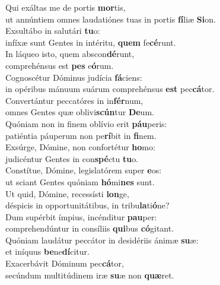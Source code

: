 \evenverse Qui exáltas me de portis \textbf{mor}tis,~\*\\
\evenverse ut annúntiem omnes laudatiónes tuas in portis \textbf{fí}liæ \textbf{Si}on.\\
\oddverse Exsultábo in salutári \textbf{tu}o:~\*\\
\oddverse infíxæ sunt Gentes in intéritu, \textbf{quem} fe\textbf{cé}runt.\\
\evenverse In láqueo isto, quem abscon\textbf{dé}runt,~\*\\
\evenverse comprehénsus est \textbf{pes} e\textbf{ó}rum.\\
\oddverse Cognoscétur Dóminus judícia \textbf{fá}ciens:~\*\\
\oddverse in opéribus mánuum suárum comprehénsus \textbf{est} pec\textbf{cá}tor.\\
\evenverse Convertántur peccatóres in in\textbf{fér}num,~\*\\
\evenverse omnes Gentes quæ oblivi\textbf{scún}tur \textbf{De}um.\\
\oddverse Quóniam non in finem oblívio erit \textbf{páu}peris:~\*\\
\oddverse patiéntia páuperum non pe\textbf{rí}bit in \textbf{fi}nem.\\
\evenverse Exsúrge, Dómine, non confortétur \textbf{ho}mo:~\*\\
\evenverse judicéntur Gentes in con\textbf{spé}ctu \textbf{tu}o.\\
\oddverse Constítue, Dómine, legislatórem super \textbf{e}os:~\*\\
\oddverse ut sciant Gentes quóniam \textbf{hó}mi\textbf{nes} sunt.\\
\evenverse Ut quid, Dómine, recessísti \textbf{lon}ge,~\*\\
\evenverse déspicis in opportunitátibus, in tribu\textbf{la}ti\textbf{ó}ne?\\
\oddverse Dum supérbit ímpius, incénditur \textbf{pau}per:~\*\\
\oddverse comprehendúntur in consíliis \textbf{qui}bus \textbf{có}gitant.\\
\evenverse Quóniam laudátur peccátor in desidériis ánimæ \textbf{su}æ:~\*\\
\evenverse et iníquus \textbf{be}ne\textbf{dí}citur.\\
\oddverse Exacerbávit Dóminum pec\textbf{cá}tor,~\*\\
\oddverse secúndum multitúdinem iræ \textbf{su}æ non \textbf{quæ}ret.\\
